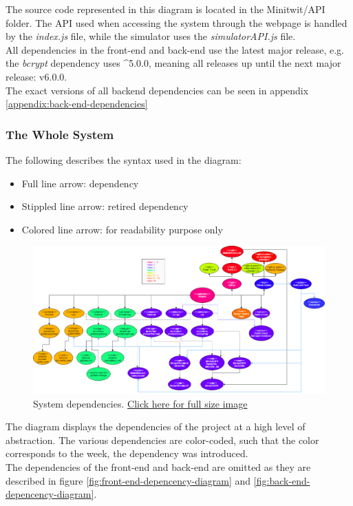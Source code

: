 \noindent
The source code represented in this diagram is located in the Minitwit/API folder. The API used when accessing the system through the webpage is handled by the \textit{index.js} file, while the simulator uses the \textit{simulatorAPI.js} file.\\
All dependencies in the front-end and back-end use the latest major release, e.g. the \textit{bcrypt} dependency uses \^{}5.0.0, meaning all releases up until the next major release: v6.0.0. \\
The exact versions of all backend dependencies can be seen in appendix \ref{appendix:back-end-dependencies}

\subsubsection{The Whole System}
The following describes the syntax used in the diagram:
\begin{itemize}
    \item Full line arrow: dependency
    \item Stippled line arrow: retired dependency
    \item Colored line arrow: for readability purpose only
\end{itemize}

\begin{figure}[H]
    \centering
    \includegraphics[scale=0.25]{report/images/system-dependencies.png}
    \caption{System dependencies. \href{https://github.com/Niels-Frederik/MiniTwit/blob/main/report/images/system-dependencies.png}{Click here for full size image}}
    \label{fig:system-depencencies}
\end{figure}

The diagram displays the dependencies of the project at a high level of abstraction. The various dependencies are color-coded, such that the color corresponds to the week, the dependency was introduced. 
\\
The dependencies of the front-end and back-end are omitted as they are described in figure \ref{fig:front-end-depencency-diagram} and \ref{fig:back-end-depencency-diagram}.

